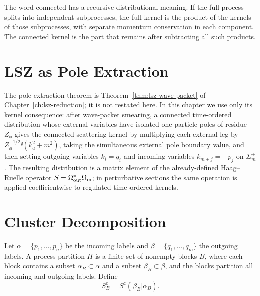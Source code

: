The word connected has a recursive distributional meaning. If the full
process splits into independent subprocesses, the full kernel is the product
of the kernels of those subprocesses, with separate momentum conservation in
each component. The connected kernel is the part that remains after subtracting
all such products.

\section{LSZ as Pole Extraction}

The pole-extraction theorem is Theorem~\ref{thm:lsz-wave-packet} of
Chapter~\ref{ch:lsz-reduction}; it is not restated here.  In this chapter we
use only its kernel consequence: after wave-packet smearing, a connected
time-ordered distribution whose external variables have isolated
one-particle poles of residue \(Z_\phi\) gives the connected scattering kernel
by multiplying each external leg by \(Z_\phi^{-1/2}\ii(k_a^2+m^2)\), taking
the simultaneous external pole boundary value, and then setting outgoing
variables \(k_i=q_i\) and incoming variables \(k_{m+j}=-p_j\) on
\(\Sigma_m^+\).  The resulting distribution is a matrix element of the
already-defined Haag--Ruelle operator
\(S=\Omega_{\rm out}^*\Omega_{\rm in}\); in perturbative sections the same
operation is applied coefficientwise to regulated time-ordered kernels.

\section{Cluster Decomposition}

Let \(\alpha=\{p_1,\ldots,p_n\}\) be the incoming labels and
\(\beta=\{q_1,\ldots,q_m\}\) the outgoing labels. A process partition
\(\Pi\) is a finite set of nonempty blocks \(B\), where each block contains a
subset \(\alpha_B\subset\alpha\) and a subset \(\beta_B\subset\beta\), and
the blocks partition all incoming and outgoing labels. Define
\[
  S_B^{\mathrm c}
  =
  S^{\mathrm c}(\beta_B|\alpha_B).
\]

